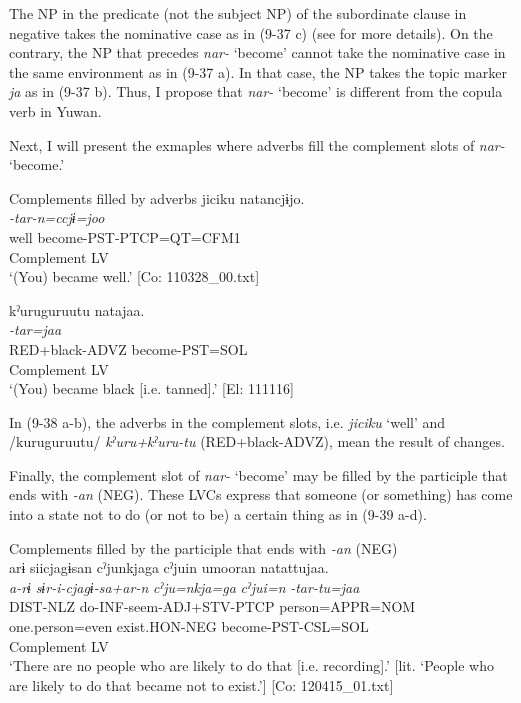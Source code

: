 The NP in the predicate (not the subject NP) of the subordinate clause in negative takes the nominative case as in (9-37 c) (see  for more details). On the contrary, the NP that precedes \textit{nar-} ‘become’ cannot take the nominative case in the same environment as in (9-37 a). In that case, the NP takes the topic marker \textit{ja} as in (9-37 b). Thus, I propose that \textit{nar-} ‘become’ is different from the copula verb in Yuwan.

  Next, I will present the exmaples where adverbs fill the complement slots of \textit{nar-} ‘become.’

\ea   Complements filled by adverbs \label{ex:9.38}
\ea \label{ex:9.38a}%
 \gllll  jiciku  natancjɨjo.\\
      \textit{}  \textit{-tar-n=ccjɨ=joo}\\
      well  become-PST-PTCP=QT=CFM1\\
      Complement  LV\\
      \glt       ‘(You) became well.’ [Co: 110328\_00.txt]

\ex \label{ex:9.38b} %
    \gllll  kˀuruguruutu  natajaa.  \\
      \textit{}  \textit{-tar=jaa} \\
      RED+black-ADVZ  become-PST=SOL  \\
      Complement  LV  \\
      \glt       ‘(You) became black [i.e. tanned].’ [El: 111116]
    \z
\z

In (9-38 a-b), the adverbs in the complement slots, i.e. \textit{jiciku} ‘well’ and /kuruguruutu/ \textit{kˀuru+kˀuru-tu} (RED+black-ADVZ), mean the result of changes.

Finally, the complement slot of \textit{nar-} ‘become’ may be filled by the participle that ends with \textit{{}-an} (NEG). These LVCs express that someone (or something) has come into a state not to do (or not to be) a certain thing as in (9-39 a-d).

\ea   Complements filled by the participle that ends with \textit{{}-an} (NEG) \label{ex:9.39}
 \ea{}\\
    \gllll  arɨ  siicjagɨsan  cˀjunkjaga   cˀjuin  umooran  natattujaa.\\
      \textit{a-rɨ}  \textit{sɨr-i-cjagɨ-sa+ar-n}  \textit{cˀju=nkja=ga} \textit{cˀjui=n}  \textit{}  \textit{-tar-tu=jaa}\\
      DIST-NLZ  do-INF-seem-ADJ+STV-PTCP  person=APPR=NOM  one.person=even  exist.HON-NEG  become-PST-CSL=SOL\\
                                                             Complement  LV\\
      \glt       ‘There are no people who are likely to do that [i.e. recording].’ [lit. ‘People who are likely to do that became not to exist.’] [Co: 120415\_01.txt]

